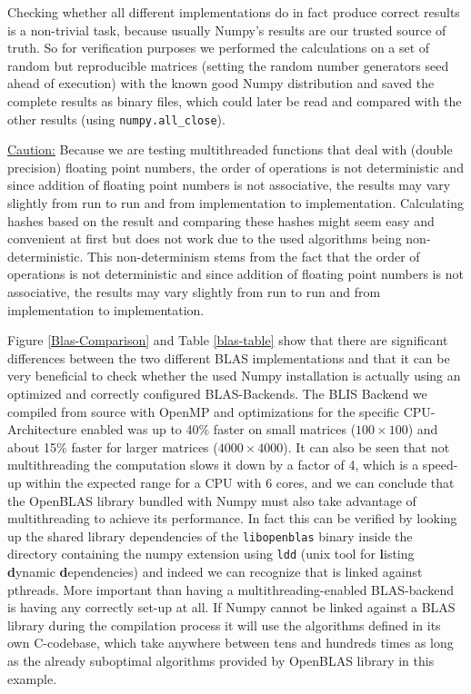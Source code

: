 \documentclass[english,11pt,a4paper,table]{article} %
\begin{document}
Checking whether all different implementations do in fact produce correct results is a non-trivial task, because usually Numpy's results are our trusted source of truth.
So for verification purposes we performed the calculations on a set of random but reproducible matrices (setting the random number generators seed ahead of execution) with the known good Numpy distribution and saved the complete results as binary files, which could later be read and compared with the other results (using \texttt{numpy.all\_close}).

\underline{Caution:} Because we are testing multithreaded functions that deal with (double precision) floating point numbers, the order of operations is not deterministic and since addition of floating point numbers is not associative, the results may vary slightly from run to run and from implementation to implementation. Calculating hashes based on the result and comparing these hashes might seem easy and convenient at first but does not work due to the used algorithms being non-deterministic.
This non-determinism stems from the fact that the order of operations is not deterministic and since addition of floating point numbers is not associative, the results may vary slightly from run to run and from implementation to implementation.

Figure \ref{Blas-Comparison} and Table \ref{blas-table} show that there are significant differences between the two different BLAS implementations and that it can be very beneficial to check whether the used Numpy installation is actually using an optimized and correctly configured BLAS-Backends.
The BLIS Backend we compiled from source with OpenMP and optimizations for the specific CPU-Architecture enabled was up to 40\% faster on small matrices ($100 \times 100$) and about 15\% faster for larger matrices ($4000 \times 4000$).
It can also be seen that not multithreading the computation slows it down by a factor of 4, which is a speed-up within the expected range for a CPU with 6 cores, and we can conclude that the OpenBLAS library bundled with Numpy must also take advantage of multithreading to achieve its performance.
In fact this can be verified by looking up the shared library dependencies of the \texttt{libopenblas} binary inside the directory containing the numpy extension using \texttt{ldd} (unix tool for \textbf{l}isting \textbf{d}ynamic \textbf{d}ependencies) and indeed we can recognize that is linked against pthreads.
More important than having a multithreading-enabled BLAS-backend is having any correctly set-up at all.
If Numpy cannot be linked against a BLAS library during the compilation process it will use the algorithms defined in its own C-codebase, which take anywhere between tens and hundreds times as long as the already suboptimal algorithms provided by OpenBLAS library in this example.
\end{document}
